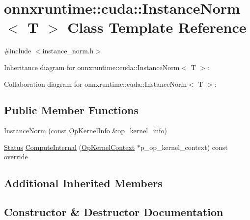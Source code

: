 \hypertarget{classonnxruntime_1_1cuda_1_1InstanceNorm}{}\section{onnxruntime\+:\+:cuda\+:\+:Instance\+Norm$<$ T $>$ Class Template Reference}
\label{classonnxruntime_1_1cuda_1_1InstanceNorm}


{\ttfamily \#include $<$instance\+\_\+norm.\+h$>$}



Inheritance diagram for onnxruntime\+:\+:cuda\+:\+:Instance\+Norm$<$ T $>$\+:


Collaboration diagram for onnxruntime\+:\+:cuda\+:\+:Instance\+Norm$<$ T $>$\+:
\subsection*{Public Member Functions}
\begin{DoxyCompactItemize}
\item 
\mbox{\hyperlink{classonnxruntime_1_1cuda_1_1InstanceNorm_aa732ea314c9c121434c0129367769ede}{Instance\+Norm}} (const \mbox{\hyperlink{classonnxruntime_1_1OpKernelInfo}{Op\+Kernel\+Info}} \&op\+\_\+kernel\+\_\+info)
\item 
\mbox{\hyperlink{classonnxruntime_1_1common_1_1Status}{Status}} \mbox{\hyperlink{classonnxruntime_1_1cuda_1_1InstanceNorm_aa3ec73604290fef52d70f27ba0db097a}{Compute\+Internal}} (\mbox{\hyperlink{classonnxruntime_1_1OpKernelContext}{Op\+Kernel\+Context}} $\ast$p\+\_\+op\+\_\+kernel\+\_\+context) const override
\end{DoxyCompactItemize}
\subsection*{Additional Inherited Members}


\subsection{Constructor \& Destructor Documentation}
\mbox{\label{classonnxruntime_1_1cuda_1_1InstanceNorm_aa732ea314c9c121434c0129367769ede}} 

